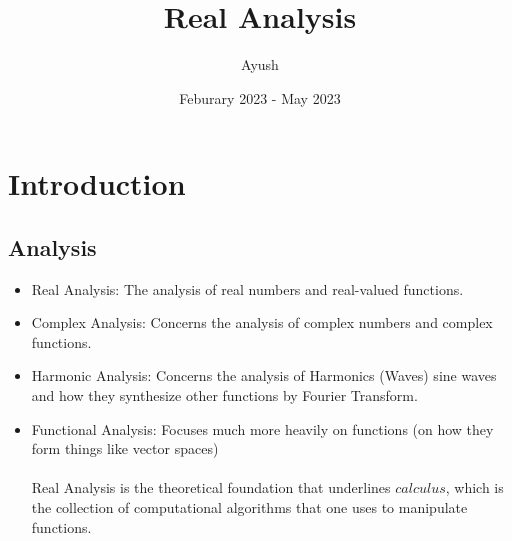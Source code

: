 \documentclass{article}
\title{Real Analysis}
\author{Ayush}
\date{Feburary 2023 - May 2023}
\begin{document}
\maketitle

\section*{Introduction}
\subsection*{Analysis}
\begin{itemize}
      \item
            Real Analysis: The analysis of real numbers and real-valued functions.
            \\
      \item
            Complex Analysis: Concerns the analysis of complex numbers and complex functions.
            \\
      \item
            Harmonic Analysis: Concerns the analysis of Harmonics (Waves) sine waves and how they synthesize other functions by Fourier Transform.
            \\
      \item
            Functional Analysis: Focuses much more heavily on functions (on how they form things like vector spaces)
            \\\\
            Real Analysis is the theoretical foundation that underlines $calculus$, which is the collection of computational algorithms that one uses to manipulate functions.

\end{itemize}
\end{document}
